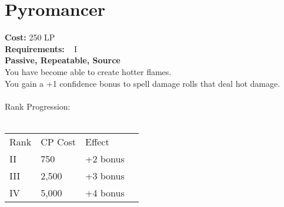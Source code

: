 \section{Pyromancer}\label{perk:pyromancer}
\textbf{Cost:} 250 LP\\
\textbf{Requirements:} ~ I\\
\textbf{Passive, Repeatable, Source}\\
You have become able to create hotter flames.\\
You gain a +1 confidence bonus to spell damage rolls that deal hot damage.\\
\\
Rank Progression:\\
\\
\begin{tabular}{l | l | l | l}
    Rank & CP Cost &  Effect\\
    II & 750 & +2 bonus\\
    III & 2,500 & +3 bonus\\
    IV & 5,000 & +4 bonus\\
\end{tabular}